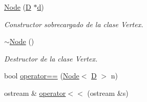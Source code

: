 \begin{DoxyCompactItemize}
\hyperlink{class_node_acae50cc855125df6d333368d28575b3e}{Node} (\hyperlink{gwp_2main_8cpp_af316c33cc298530f245e8b55330e86b5}{D} $\ast$\hyperlink{class_node_ab9a8975b57edc70d79492408a950c666}{d})
\begin{DoxyCompactList}\small\item\em Constructor sobrecargado de la clase Vertex. \end{DoxyCompactList}\item 
\hyperlink{class_node_a59a3ac8a9279e123756e679e11ea11e0}{$\sim$\+Node} ()
\begin{DoxyCompactList}\small\item\em Destructor de la clase Vertex. \end{DoxyCompactList}\item 
bool \hyperlink{class_node_a2d6a8aa109473d39eeb0c66cf0b7cf77}{operator==} (\hyperlink{class_node}{Node}$<$ \hyperlink{gwp_2main_8cpp_af316c33cc298530f245e8b55330e86b5}{D} $>$ n)
\item 
ostream \& \hyperlink{class_node_a4ebd81f613c7bbfef2ffd402ad944b5d}{operator$<$$<$} (ostream \&s)
\end{DoxyCompactItemize}
